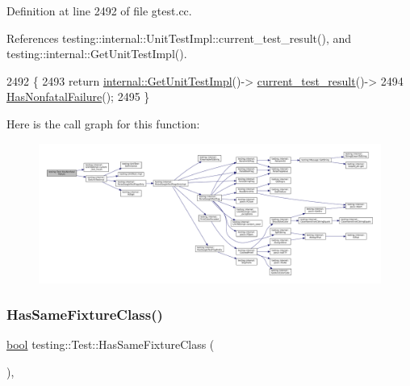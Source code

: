 Definition at line 2492 of file gtest.\+cc.



References testing\+::internal\+::\+Unit\+Test\+Impl\+::current\+\_\+test\+\_\+result(), and testing\+::internal\+::\+Get\+Unit\+Test\+Impl().


\begin{DoxyCode}
2492                               \{
2493   \textcolor{keywordflow}{return} \hyperlink{namespacetesting_1_1internal_a9bd0caf5d16512de38b39599c13ee634}{internal::GetUnitTestImpl}()->
      \hyperlink{classtesting_1_1internal_1_1UnitTestImpl_aba3caef4ad23ce98be80250aeb0cc787}{current\_test\_result}()->
2494       \hyperlink{classtesting_1_1Test_a3b933cea62eff67a05e23aa07f38bf29}{HasNonfatalFailure}();
2495 \}
\end{DoxyCode}
Here is the call graph for this function\+:
\nopagebreak
\begin{figure}[H]
\begin{center}
\leavevmode
\includegraphics[width=350pt]{classtesting_1_1Test_a3b933cea62eff67a05e23aa07f38bf29_cgraph}
\end{center}
\end{figure}
\mbox{\label{classtesting_1_1Test_a5daca5a35e33e8fbdf36b7b666668b34}} 
\subsubsection{\texorpdfstring{Has\+Same\+Fixture\+Class()}{HasSameFixtureClass()}}
{\footnotesize\ttfamily \hyperlink{classbool}{bool} testing\+::\+Test\+::\+Has\+Same\+Fixture\+Class (\begin{DoxyParamCaption}{ }\end{DoxyParamCaption})\hspace{0.3cm}{\ttfamily [static]}, {\ttfamily [private]}}




